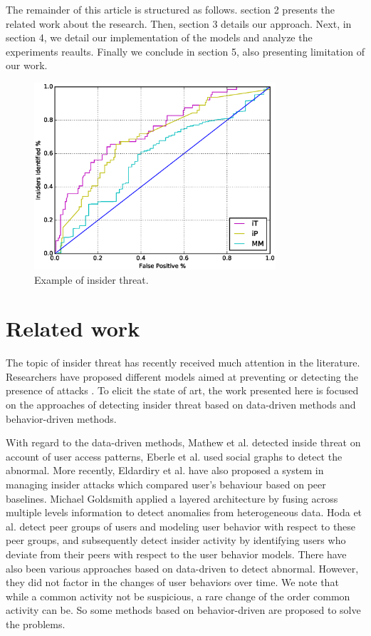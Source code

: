\documentclass[conference]{IEEEtran}
\begin{document}
The remainder of this article is structured as follows. 
section 2 presents the related work about the research.
Then, section 3 details our approach. Next, in section 4, 
we detail our implementation of the models and analyze the experiments reaults. 
Finally we conclude in section 5, also presenting limitation of our work.

\begin{figure}[htb]
\centerline{\includegraphics[width = 0.8\textwidth]{figure/figure1.eps}}
\caption{Example of insider threat.}
\label{fig}
\end{figure}


\section{Related work}
The topic of insider threat has recently received much attention in the literature. Researchers have proposed different models aimed at preventing or detecting the presence of attacks \cite{b11}\cite{b12}. To elicit the state of art, the work
presented here is focused on the approaches of detecting  insider threat based on data-driven methods and behavior-driven methods.

With regard to the data-driven methods, Mathew et al.\cite{b13} detected inside threat on account of user access patterns, Eberle et al. \cite{b14} used social graphs to detect the abnormal. More recently, Eldardiry et al. \cite{b15} have also proposed a system in managing insider
attacks which compared user’s behaviour based on peer baselines.
Michael Goldsmith applied a layered architecture by  fusing across multiple levels information to detect anomalies from heterogeneous data\cite{b16}. Hoda et al. \cite{b13} detect peer groups of users and modeling user behavior with respect to these peer groups, and subsequently detect insider activity by identifying users who deviate from their peers with respect to the user behavior models. 
There have also been various approaches based on data-driven to detect abnormal\cite{b10}\cite{b8}. 
However, they did not factor in the changes of user behaviors over time. We note that while a common activity not be suspicious, a rare change of the order  common activity can be. So some methods based on behavior-driven are proposed to solve the problems. 
\end{document}
